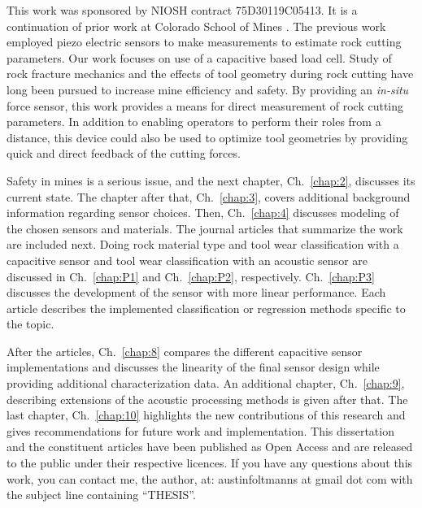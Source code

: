 This work was sponsored by NIOSH contract 75D30119C05413.
It is a continuation of prior work at Colorado School of Mines \cite{11124/170545}.
The previous work employed piezo electric sensors to make measurements to estimate
rock cutting parameters. 
Our work focuses on use of a capacitive based load cell.
Study of rock fracture mechanics \cite{11124/14359} 
and the effects of tool geometry during rock cutting \cite{11124/13192, 11124/16423, 11124/176345} 
have long been pursued to increase mine efficiency and safety.
By providing an \textit{in-situ} force sensor, this work provides a means
for direct measurement of rock cutting parameters.
In addition to enabling operators to perform their roles from a distance,
this device could also be used to optimize tool geometries 
by providing quick and direct feedback of the cutting forces.

Safety in mines is a serious issue, and the next chapter, Ch.~\ref{chap:2}, discusses its current state.
The chapter after that, Ch.~\ref{chap:3}, covers additional background information regarding sensor choices.
Then, Ch.~\ref{chap:4} discusses modeling of the chosen sensors and materials.
The journal articles that summarize the work are included next. 
Doing rock material type and tool wear classification with a capacitive sensor and 
tool wear classification with an acoustic sensor
are discussed in Ch.~\ref{chap:P1} and Ch.~\ref{chap:P2}, respectively.
Ch.~\ref{chap:P3} discusses the development of the sensor with more linear performance.
Each article describes the implemented classification or regression methods specific to the topic.

After the articles, Ch.~\ref{chap:8} compares the different capacitive sensor implementations
and discusses the linearity of the final sensor design while providing additional characterization data.
An additional chapter, Ch.~\ref{chap:9}, describing extensions of the acoustic processing methods is given after that.
The last chapter, Ch.~\ref{chap:10} highlights the new contributions of this research and gives recommendations 
for future work and implementation.
This dissertation and the constituent articles have been published as 
Open Access and are released to the public under their respective licences.
If you have any questions about this work, you can contact me, the author, at:
austinfoltmanns at gmail dot com with the subject line containing ``THESIS''.

